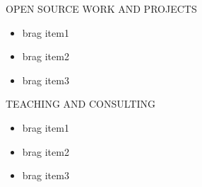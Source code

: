 \documentclass{smartcv} %
\begin{document}
\begin{rSection}{OPEN SOURCE WORK AND PROJECTS}
  \begin{itemize}
    \item brag item1
    \item brag item2
    \item brag item3
  \end{itemize}

\end{rSection}

\begin{rSection}{TEACHING AND CONSULTING}
  \begin{itemize}
    \item brag item1
    \item brag item2
    \item brag item3
  \end{itemize}

\end{rSection}
\end{document}
